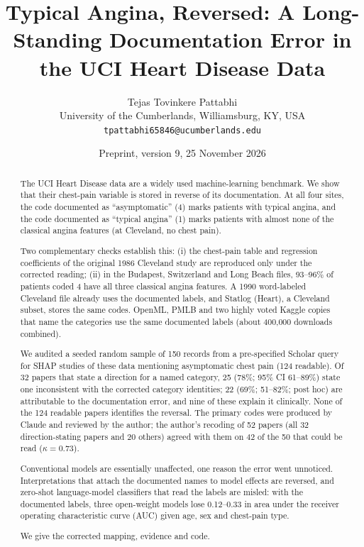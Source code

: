 \documentclass[11pt]{article}
\title{Typical Angina, Reversed: A Long-Standing Documentation Error in the UCI Heart Disease Data}
\author{Tejas Tovinkere Pattabhi\\
University of the Cumberlands, Williamsburg, KY, USA\\
\texttt{tpattabhi65846@ucumberlands.edu}}
\date{Preprint, version 9, 25 November 2026}
\begin{document}
\maketitle

\begin{abstract}
The UCI Heart Disease data are a widely used machine-learning benchmark. We show that their chest-pain variable is stored in reverse of its documentation. At all four sites, the code documented as ``asymptomatic'' (4) marks patients with typical angina, and the code documented as ``typical angina'' (1) marks patients with almost none of the classical angina features (at Cleveland, no chest pain).

Two complementary checks establish this:
(i) the chest-pain table and regression coefficients of the original 1986 Cleveland study are reproduced only under the corrected reading;
(ii) in the Budapest, Switzerland and Long Beach files, 93--96\% of patients coded 4 have all three classical angina features.
A 1990 word-labeled Cleveland file already uses the documented labels, and Statlog (Heart), a Cleveland subset, stores the same codes. OpenML, PMLB and two highly voted Kaggle copies that name the categories use the same documented labels (about 400{,}000 downloads combined).

We audited a seeded random sample of 150 records from a pre-specified Scholar query for SHAP studies of these data mentioning asymptomatic chest pain (124 readable). Of 32 papers that state a direction for a named category, 25 (78\%; 95\% CI 61--89\%) state one inconsistent with the corrected category identities; 22 (69\%; 51--82\%; post hoc) are attributable to the documentation error, and nine of these explain it clinically. None of the 124 readable papers identifies the reversal. The primary codes were produced by Claude and reviewed by the author; the author's recoding of 52 papers (all 32 direction-stating papers and 20 others) agreed with them on 42 of the 50 that could be read ($\kappa=0.73$).

Conventional models are essentially unaffected, one reason the error went unnoticed. Interpretations that attach the documented names to model effects are reversed, and zero-shot language-model classifiers that read the labels are misled: with the documented labels, three open-weight models lose 0.12--0.33 in area under the receiver operating characteristic curve (AUC) given age, sex and chest-pain type.

We give the corrected mapping, evidence and code.
\end{abstract}
\end{document}
